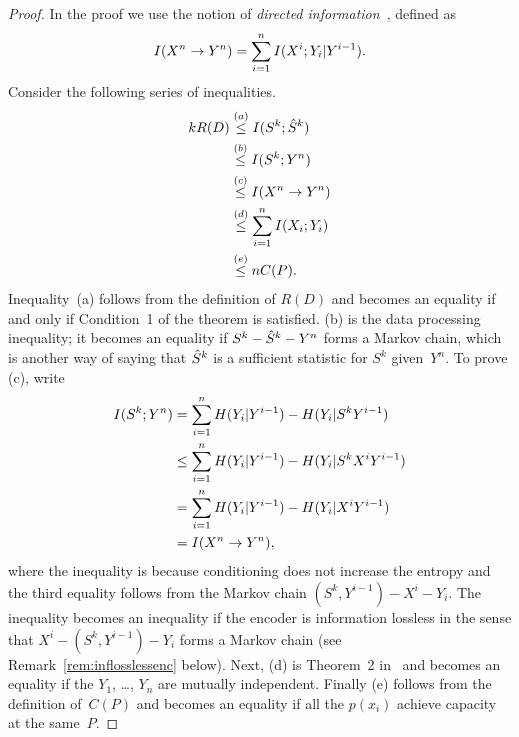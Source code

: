 \begin{proof}
  In the proof we use the notion of \emph{directed
  information}~\cite{Massey1990,Kramer1998}, defined as
  \begin{equation*}
    I(X^n \rightarrow Y^n) = \sum_{i=1}^n I(X^i; Y_i | Y^{i-1}).
  \end{equation*}
  Consider the following series of inequalities.
  \begin{align*}
    kR(D) &\stackrel{(a)}{\le} I(S^k; {\hat{S}}^k) \\
    &\stackrel{(b)}{\le} I(S^k; Y^n) \\
    &\stackrel{(c)}{\le} I(X^n \rightarrow Y^n) \\
    &\stackrel{(d)}{\le} \sum_{i=1}^n I(X_i; Y_i) \\
    &\stackrel{(e)}{\le} nC(P).
  \end{align*}
  Inequality~(a) follows from the definition of $R(D)$ and becomes an equality
  if and only if Condition~1 of the theorem is satisfied. (b) is the data
  processing inequality; it becomes an equality if $S^k - {\hat{S}}^k - Y^n$ forms a
  Markov chain, which is another way of saying that ${\hat{S}}^k$ is a sufficient
  statistic for $S^k$ given~$Y^n$.  To prove (c), write
  \begin{align*}
    I(S^k; Y^n)
    &= \sum_{i=1}^n H(Y_i|Y^{i-1}) - H(Y_i | S^k Y^{i-1}) \\
    &\le \sum_{i=1}^n H(Y_i|Y^{i-1}) - H(Y_i | S^k X^i Y^{i-1}) \\
    &= \sum_{i=1}^n H(Y_i|Y^{i-1}) - H(Y_i | X^i Y^{i-1}) \\
    &= I(X^n \rightarrow Y^n),
  \end{align*}
  where the inequality is because conditioning does not increase the entropy and
  the third equality follows from the Markov chain $(S^k, Y^{i-1}) - X^i - Y_i$.
  The inequality becomes an inequality if the encoder is information lossless in
  the sense that $X^i - (S^k, Y^{i-1}) - Y_i$ forms a Markov chain (see
  Remark~\ref{rem:inflosslessenc} below). Next, (d) is Theorem~2
  in~\cite{Massey1990} and becomes an equality if the $Y_1$, \dots, $Y_n$ are
  mutually independent. Finally (e) follows from the definition of~$C(P)$ and
  becomes an equality if all the $p(x_i)$ achieve capacity at the same~$P$. 
\end{proof}

